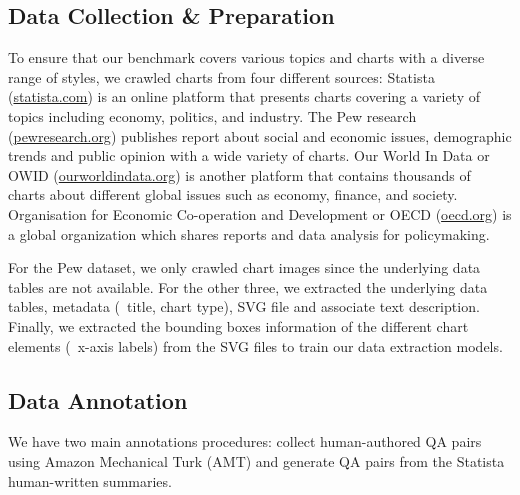 \subsection{Data Collection \& Preparation}

To ensure that our 
benchmark
covers various topics and 
charts with a diverse range of styles, we crawled charts from four different sources: 
\Ni Statista ({\href{https://www.statista.com}{statista.com}}) is an online platform that presents charts covering a variety of topics including economy, politics, and industry.  
\Nii The Pew research {(\href{https://www.pewresearch.org}{pewresearch.org})} %
publishes report about social and economic issues, demographic trends and public opinion with a wide variety of charts. 
\Niii Our World In Data or OWID {(\href{https://ourworldindata.org}{ourworldindata.org})}  
is %
another platform that contains thousands of charts  about different global issues such as economy, finance, and society. %
\Niv Organisation for Economic Co-operation and Development or OECD {(\href{https://www.oecd.org}{oecd.org})} is a global organization which shares 
reports and data analysis for policymaking. 


For the Pew dataset, we only crawled chart images since  the underlying data tables are not available. For the other three, we extracted the underlying data tables, metadata (\eg\ title, chart type), SVG file and associate text description.  Finally, we extracted the bounding boxes information of the different chart elements (\eg\ x-axis labels) from the SVG files to train our data extraction models.





\subsection{Data Annotation} \label{subsec:data-annot}
We have two main annotations procedures: \Ni collect human-authored QA pairs using Amazon Mechanical Turk (AMT) and \Nii generate QA pairs from the Statista human-written summaries. 

